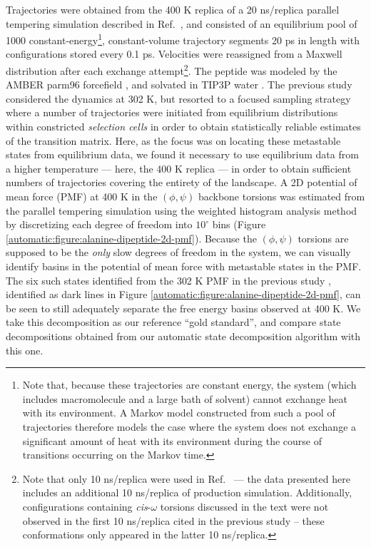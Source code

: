 Trajectories were obtained from the 400 K replica of a 20 ns/replica parallel tempering simulation described in Ref.\ \cite{chodera:mms:2006}, and consisted of an equilibrium pool of 1000 constant-energy\footnote{Note that, because these trajectories are constant energy, the system (which includes macromolecule and a large bath of solvent) cannot exchange heat with its environment.  A Markov model constructed from such a pool of trajectories therefore models the case where the system does not exchange a significant amount of heat with its environment during the course of transitions occurring on the Markov time.}, constant-volume trajectory segments 20 ps in length with configurations stored every 0.1 ps.
Velocities were reassigned from a Maxwell distribution after each exchange attempt\footnote{Note that only 10 ns/replica were used in Ref.\ \cite{chodera:mms:2006} --- the data presented here includes an additional 10 ns/replica of production simulation.  Additionally, configurations containing \emph{cis}-$\omega$ torsions discussed in the text were not observed in the first 10 ns/replica cited in the previous study -- these conformations only appeared in the latter 10 ns/replica.}.
The peptide was modeled by the AMBER parm96 forcefield \cite{AMBER-parm96}, and solvated in TIP3P water \cite{jorgensen:1983a}.
The previous study \cite{chodera:mms:2006} considered the dynamics at 302 K, but resorted to a focused sampling strategy where a number of trajectories were initiated from equilibrium distributions within constricted \emph{selection cells} \cite{swope:2004a} in order to obtain statistically reliable estimates of the transition matrix.
Here, as the focus was on locating these metastable states from equilibrium data, we found it necessary to use equilibrium data from a higher temperature --- here, the 400 K replica --- in order to obtain sufficient numbers of trajectories covering the entirety of the landscape.
A 2D potential of mean force (PMF) at 400 K in the $(\phi,\psi)$ backbone torsions was estimated from the parallel tempering simulation using the weighted histogram analysis method \cite{kumar:1992a,chodera:jctc:2006} by discretizing each degree of freedom into $10^\circ$ bins (Figure \ref{automatic:figure:alanine-dipeptide-2d-pmf}).
Because the $(\phi,\psi)$ torsions are supposed to be the \emph{only} slow degrees of freedom in the system, we can visually identify basins in the potential of mean force with metastable states in the PMF.
The six such states identified from the 302 K PMF in the previous study \cite{chodera:mms:2006}, identified as dark lines in Figure \ref{automatic:figure:alanine-dipeptide-2d-pmf}, can be seen to still adequately separate the free energy basins observed at 400 K.
We take this decomposition as our reference ``gold standard'', and compare state decompositions obtained from our automatic state decomposition algorithm with this one.


